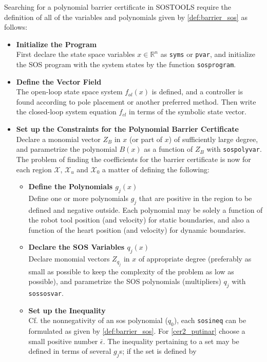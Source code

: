 Searching for a polynomial barrier certificate in SOSTOOLS require the definition of all of the variables and polynomials given by \autoref{def:barrier_sos} as follows:
\vspace{-2mm}
\renewcommand{\labelitemii}{$\circ$}
\renewcommand{\labelitemiii}{$\bullet$}
\begin{itemize}
	\itemsep-0.7mm
	\item \textbf{Initialize the Program}\\
	First declare the state space variables $x\in\mathbb{R}^n$ as \texttt{syms} or \texttt{pvar}, and initialize the SOS program with the system states by the function \texttt{sosprogram}.
	\item \textbf{Define the Vector Field}\\
	The open-loop state space system $f_{ol}(x)$ is defined, and a controller is found according to pole placement or another preferred method. Then write the closed-loop system equation $f_{cl}$ in terms of the symbolic state vector.
	\item \textbf{Set up the Constraints for the Polynomial Barrier Certificate}\\
	Declare a monomial vector $Z_B$ in $x$ (or part of $x$) of sufficiently large degree, and parametrize the polynomial $B(x)$ as a function of $Z_B$ with \texttt{sospolyvar}.  
	The problem of finding the coefficients for the barrier certificate is now for each region $\mathcal{X}$, $\mathcal{X}_u$ and $\mathcal{X}_0$ a matter of defining the following:
	\vspace*{-1mm}
	\begin{itemize}
		\item \textbf{Define the Polynomials $g_j(x)$}\\
		Define one or more polynomials $g_j$ that are positive in the region to be defined and negative outside. Each polynomial may be solely a function of the robot tool position (and velocity) for static boundaries, and also a function of the heart position (and velocity) for dynamic boundaries. 
		\item \textbf{Declare the SOS Variables $q_j(x)$}\\
		Declare monomial vectors $Z_{q_j}$ in $x$ of appropriate degree (preferably as small as possible to keep the complexity of the problem as low as possible), and parametrize the SOS polynomials (multipliers) $q_j$ with \texttt{sossosvar}.
		\item \textbf{Set up the Inequality}\\
		Cf. the nonnegativity of an \gls{sos} polynomial ($q_0$), each \texttt{sosineq} can be formulated as given by  \autoref{def:barrier_sos}. For \autoref{cer2_putinar} choose a small positive number $\bar{\epsilon}$. The inequality pertaining to a set may be defined in terms of several $g_j$s; if the set is defined by

\end{itemize}
\end{itemize}
